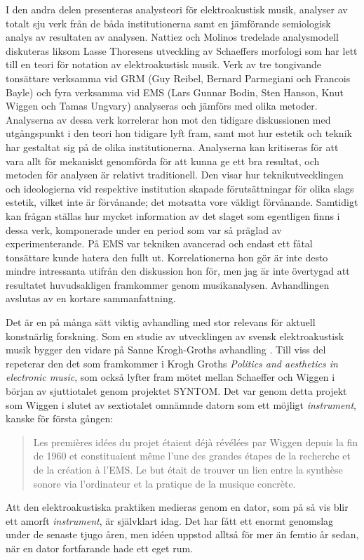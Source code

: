 \documentclass[11pt]{article}
\begin{document}
I den andra delen presenteras analysteori för elektroakustisk musik, analyser av totalt sju verk från de båda institutionerna samt en jämförande semiologisk analys av resultaten av analysen. Nattiez och Molinos tredelade analysmodell diskuteras liksom Lasse Thoresens utveckling av Schaeffers morfologi som har lett till en teori för notation av elektroakustisk musik. Verk av tre tongivande tonsättare verksamma vid GRM (Guy Reibel, Bernard Parmegiani och Francois Bayle) och fyra verksamma vid EMS (Lars Gunnar Bodin, Sten Hanson, Knut Wiggen och Tamas Ungvary) analyseras och jämförs med olika metoder. Analyserna av dessa verk korrelerar hon mot den tidigare diskussionen med utgångspunkt i den teori hon tidigare lyft fram, samt mot hur estetik och teknik har gestaltat sig på de olika institutionerna. Analyserna kan kritiseras för att vara allt för mekaniskt genomförda för att kunna ge ett bra resultat, och metoden för analysen är relativt traditionell. Den visar hur teknikutvecklingen och ideologierna vid respektive institution skapade förutsättningar för olika slags estetik, vilket inte är förvånande; det motsatta vore väldigt förvånande. Samtidigt kan frågan ställas hur mycket information av det slaget som egentligen finns i dessa verk, komponerade under en period som var så präglad av experimenterande. På EMS var tekniken avancerad och endast ett fåtal tonsättare kunde hatera den fullt ut. Korrelationerna hon gör är inte desto mindre intressanta utifrån den diskussion hon för, men jag är inte övertygad att resultatet huvudsakligen framkommer genom musikanalysen. Avhandlingen avslutas av en kortare sammanfattning.

Det är en på många sätt viktig avhandling med stor relevans för aktuell konstnärlig forskning. Som en studie av utvecklingen av svensk elektroakustisk musik bygger den vidare på Sanne Krogh-Groths avhandling \citet{groth2016}. Till viss del repeterar den det som framkommer i Krogh Groths \emph{Politics and aesthetics in electronic music}, som också lyfter fram mötet mellan Schaeffer och Wiggen i början av sjuttiotalet genom projektet SYNTOM. Det var genom detta projekt som Wiggen i slutet av sextiotalet omnämnde datorn som ett möjligt \emph{instrument}, kanske för första gången:

\begin{quote}
Les premières idées du projet étaient déjà révélées par Wiggen depuis la fin de 1960 et constituaient même l’une des grandes étapes de la recherche et de la création à l’EMS. Le but était de trouver un lien entre la synthèse sonore via l’ordinateur et la pratique de la musique concrète. \citep[s. 64]{Balkir2018}
\end{quote}
Att den elektroakustiska praktiken medieras genom en dator, som på så vis blir ett amorft \emph{instrument}, är självklart idag. Det har fått ett enormt genomslag under de senaste tjugo åren, men idéen uppstod alltså för mer än femtio år sedan, när en dator fortfarande hade ett eget rum.
\end{document}
